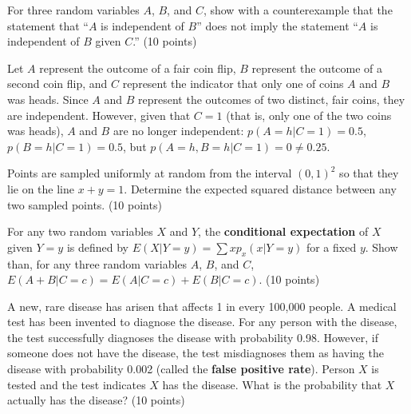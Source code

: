 \documentclass[fleqn]{homework}
\begin{document}
  \maketitle

  \begin{problem}{1}
    \begin{question}
      For three random variables $A$, $B$, and $C$, show with a counterexample
      that the statement that ``$A$ is independent of $B$'' does not imply the
      statement ``$A$ is independent of $B$ given $C$.'' (10 points)
    \end{question}

    Let $A$ represent the outcome of a fair coin flip, $B$ represent the outcome
    of a second coin flip, and $C$ represent the indicator that only one of
    coins $A$ and $B$ was heads.  Since $A$ and $B$ represent the outcomes of
    two distinct, fair coins, they are independent.  However, given that $C=1$
    (that is, only one of the two coins was heads), $A$ and $B$ are no longer
    independent: $p(A=h|C=1) = 0.5$, $p(B=h|C=1) = 0.5$, but
    $p(A=h, B=h | C=1) = 0 \neq 0.25$.
  \end{problem}

  \begin{problem}{2}
    \begin{question}
      Points are sampled uniformly at random from the interval $(0,1)^2$ so that
      they lie on the line $x+y=1$.  Determine the expected squared distance
      between any two sampled points. (10 points)
    \end{question}
  \end{problem}

  \begin{problem}{3}
    \begin{question}
      For any two random variables $X$ and $Y$, the \textbf{conditional
        expectation} of $X$ given $Y=y$ is defined by
      $E(X|Y=y) = \sum x p_x(x|Y=y)$ for a fixed $y$.  Show than, for any three
      random variables $A$, $B$, and $C$, $E(A+B|C=c) = E(A|C=c) +
      E(B|C=c)$. (10 points)
    \end{question}
  \end{problem}

  \begin{problem}{4}
    \begin{question}
      A new, rare disease has arisen that affects 1 in every 100,000 people.  A
      medical test has been invented to diagnose the disease.  For any person
      with the disease, the test successfully diagnoses the disease with
      probability 0.98.  However, if someone does not have the disease, the test
      misdiagnoses them as having the disease with probability 0.002 (called the
      \textbf{false positive rate}).  Person $X$ is tested and the test
      indicates $X$ has the disease.  What is the probability that $X$ actually
      has the disease? (10 points)
    \end{question}
  \end{problem}
\end{document}
